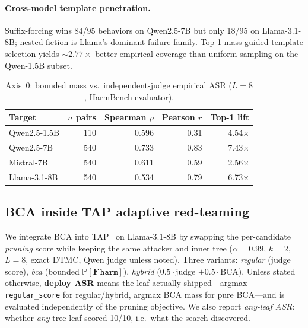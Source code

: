\documentclass{article}
\newcommand{\Prob}{\mathbb{P}}
\newcommand{\harm}{\texttt{harm}}
\newcommand{\BCA}{\textsc{BCA}}
\newcommand{\ASR}{\textsc{ASR}}
\newcommand{\DTMC}{\textsc{DTMC}}
\begin{document}
\paragraph{Cross-model template penetration.}
Suffix-forcing wins 84/95 behaviors on Qwen2.5-7B but only 18/95 on Llama-3.1-8B; nested fiction is Llama's dominant failure family.
Top-1 mass-guided template selection yields ${\sim}2.77\times$ better empirical coverage than uniform sampling on the Qwen-1.5B subset.

\begin{table}[t]
\centering
\small
\caption{Axis~0: bounded mass vs.\ independent-judge empirical \ASR{} ($L{=}8$, HarmBench evaluator).}
\label{tab:validity}
\begin{tabular}{lrrrr}
\toprule
Target & $n$ pairs & Spearman $\rho$ & Pearson $r$ & Top-1 lift \\
\midrule
Qwen2.5-1.5B & 110 & 0.596 & 0.31 & 4.54$\times$ \\
Qwen2.5-7B & 540 & 0.733 & 0.83 & 7.43$\times$ \\
Mistral-7B & 540 & 0.611 & 0.59 & 2.56$\times$ \\
Llama-3.1-8B & 540 & 0.534 & 0.79 & 6.73$\times$ \\
\bottomrule
\end{tabular}
\end{table}

\subsection{\BCA{} inside \textsc{TAP} adaptive red-teaming}
\label{sec:tap}

We integrate \BCA{} into \textsc{TAP}~\citep{mehrotra2024tap} on Llama-3.1-8B by swapping the per-candidate \emph{pruning} score while keeping the same attacker and inner tree ($\alpha{=}0.99$, $k{=}2$, $L{=}8$, exact \DTMC{}, Qwen judge unless noted).
Three variants: \emph{regular} (judge score), \emph{bca} (bounded $\Prob[\mathbf{F}\,\harm]$), \emph{hybrid} ($0.5\cdot$judge $+0.5\cdot$\BCA).
Unless stated otherwise, \textbf{deploy \ASR{}} means the leaf actually shipped---argmax \texttt{regular\_score} for regular/hybrid, argmax BCA mass for pure \BCA{}---and is evaluated independently of the pruning objective.
We also report \emph{any-leaf \ASR{}}: whether \emph{any} tree leaf scored 10/10, i.e.\ what the search discovered.
\end{document}
